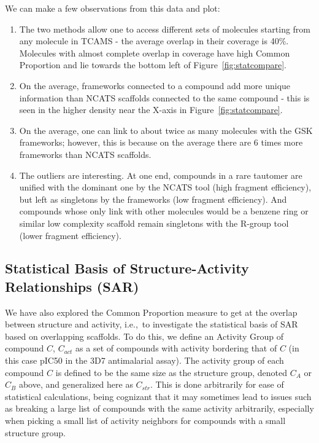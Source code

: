 \documentclass[journal=jacsat,manuscript=article]{achemso}
\newcommand*\fref[1]{Figure~\ref{fig:#1}}
\newcommand*\eg{e.g.,~}
\newcommand*\ie{i.e.,~}
\begin{document}
We can make a few observations from this data and plot:
\begin{enumerate} 
\item The two methods allow one to access different sets of molecules starting from any molecule in TCAMS - the average overlap in their coverage is 40\%.  Molecules with almost complete overlap in coverage have high Common Proportion and lie towards the bottom left of \fref{statcompare}. 
\item On the average, frameworks connected to a compound add more unique information than NCATS scaffolds connected to the same compound - this is seen in the higher density near the X-axis in \fref{statcompare}.   
\item On the average, one can link to about twice as many molecules with the GSK frameworks; however, this is because on the average there are 6 times more frameworks than NCATS scaffolds. %
\item The outliers are interesting. At one end, compounds in a rare tautomer are unified with the dominant one by the NCATS tool (high fragment efficiency), but left as singletons by the frameworks (low fragment efficiency). And compounds whose only link with other molecules would be a benzene ring or similar low complexity scaffold remain singletons with the R-group tool (lower fragment efficiency).
\end{enumerate}

\subsection{Statistical Basis of Structure-Activity Relationships (SAR)}\label{sec:statSAR}

We have also explored the Common Proportion measure to get at the overlap between structure and activity, \ie to investigate the statistical basis of SAR based on overlapping scaffolds. To do this, we define an Activity Group of compound $C$, $C_{act}$ as a set of compounds with activity bordering that of $C$ (in this case pIC50 in the 3D7 antimalarial assay). The activity group of each compound $C$ is defined to be the same size as the structure group, denoted $C_A$ or $C_B$ above, and generalized here as $C_{str}$.  This is done arbitrarily for ease of statistical calculations, being cognizant that it may sometimes lead to issues such as breaking a large list of compounds with the same activity arbitrarily, especially when picking a small list of activity neighbors for compounds with a small structure group.
\end{document}
